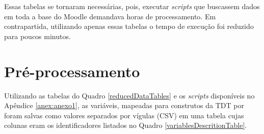 
Essas tabelas se tornaram necessárias, pois, executar \textit{scripts} que
buscassem dados em toda a base do Moodle demandava horas de processamento. Em
contrapartida, utilizando apenas essas tabelas o tempo de execução foi reduzido
para poucos minutos.

\section{Pré-processamento}

Utilizando as tabelas do Quadro \ref{reducedDataTables} e os \textit{scripts}
disponíveis no Apêndice \ref{anex:anexo1}, as variáveis, mapeadas para construtos
da TDT por  foram salvas como valores separados
por vígulas (CSV) em uma tabela cujas colunas eram os identificadores listados
no Quadro \ref{variablesDescritionTable}.

